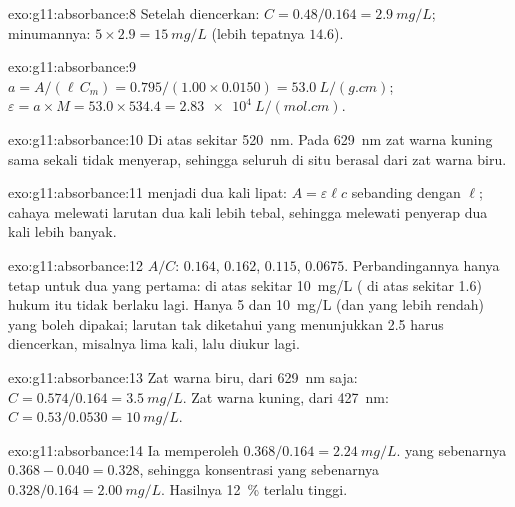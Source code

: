 \begin{solution}{exo:g11:absorbance:8}
Setelah diencerkan: $C = 0.48 / 0.164 = \qty{2.9}{mg/L}$; minumannya:
$5 \times 2.9 = \qty{15}{mg/L}$ (lebih tepatnya $14.6$).
\end{solution}

\begin{solution}{exo:g11:absorbance:9}
$a = A / (\ell\, C_m) = 0.795 / (1.00 \times 0.0150) = \qty{53.0}{L/(g.cm)}$;
$\varepsilon = a \times M = 53.0 \times 534.4 = \qty{2.83e4}{L/(mol.cm)}$.
\end{solution}

\begin{solution}{exo:g11:absorbance:10}
Di atas sekitar \qty{520}{nm}. Pada \qty{629}{nm} zat warna kuning sama
sekali tidak menyerap, sehingga seluruh  di situ berasal dari
zat warna biru.
\end{solution}

\begin{solution}{exo:g11:absorbance:11}
 menjadi dua kali lipat: $A = \varepsilon \ell c$ sebanding
dengan $\ell$; cahaya melewati larutan dua kali lebih tebal, sehingga
melewati  penyerap dua kali lebih banyak.
\end{solution}

\begin{solution}{exo:g11:absorbance:12}
$A/C$: $0.164$, $0.162$, $0.115$, $0.0675$. Perbandingannya hanya tetap
untuk dua yang pertama: di atas sekitar \qty{10}{mg/L} ( di
atas sekitar 1.6) hukum itu tidak berlaku lagi. Hanya  5
dan \qty{10}{mg/L} (dan yang lebih rendah) yang boleh dipakai; larutan
tak diketahui yang menunjukkan 2.5 harus diencerkan, misalnya lima kali,
lalu diukur lagi.
\end{solution}

\begin{solution}{exo:g11:absorbance:13}
Zat warna biru, dari \qty{629}{nm} saja:
$C = 0.574 / 0.164 = \qty{3.5}{mg/L}$. Zat warna kuning, dari
\qty{427}{nm}: $C = 0.53 / 0.0530 = \qty{10}{mg/L}$.
\end{solution}

\begin{solution}{exo:g11:absorbance:14}
Ia memperoleh $0.368 / 0.164 = \qty{2.24}{mg/L}$.  yang
sebenarnya $0.368 - 0.040 = 0.328$, sehingga konsentrasi yang sebenarnya
$0.328 / 0.164 = \qty{2.00}{mg/L}$. Hasilnya \qty{12}{\percent} terlalu
tinggi.
\end{solution}

